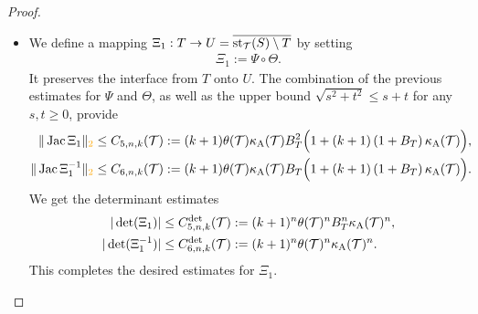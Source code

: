 \documentclass[10pt,letterpaper]{article}
\newcommand\cye[1]{%
  \protect\leavevmode
  \begingroup
    \color{red!35!yellow}%
    #1%
  \endgroup
}
\begin{document}
\begin{proof}
\begin{itemize}
        
        \item 
        We define a mapping $ \Xi_{1} : T \rightarrow U = \overline{\operatorname{st}_{{\mathcal T}}(S) \setminus T}$ by setting 
        \begin{align*}
            \Xi_{1} := \Psi \circ \Theta.
        \end{align*}
        It preserves the interface from $T$ onto $U$. 
        The combination of the previous estimates for $\Psi$ and $\Theta$,
        as well as the upper bound $\sqrt{s^2+t^2} \leq s + t$ for any $s,t \geq 0$,
        provide 
        \begin{align*}
            \| \Jacobian \Xi_{1} \|_{\cye{2}}
            &\leq 
            \Cfive{n}{k}(\calT)
            :=
            (k+1) 
            \theta(\calT)
            \kappa_{\maxcol}(\calT)
            B_{T}^{2}
            \Big( 
                1 
                + 
                (k+1) 
                \left( 1 + B_{T} \right)
                \kappa_{\maxcol}(\calT)
            \Big)            
            ,
            \\
            \| \Jacobian \Xi_{1}^{-1} \|_{\cye{2}}
            &\leq  
            \Csechs{n}{k}(\calT)
            :=
            (k+1) 
            \theta(\calT)
            \kappa_{\maxcol}(\calT)
            B_{T}
            \Big( 
                1 
                + 
                (k+1) 
                \left( 1 + B_{T} \right)
                \kappa_{\maxcol}(\calT)
            \Big)            
            .
        \end{align*}
        We get the determinant estimates
        \begin{align*}
            |\det(\Xi_{1})|
            &\leq 
            C^{\det}_{5,n,k}({\mathcal T})
            :=
            (k+1)^{n}
            \theta({\mathcal T})^{n}
            B_{T}^{n}
            \kappa_{{\rm A}}({\mathcal T})^{n}
            ,
            \\
            |\det(\Xi_{1}^{-1})|
            &\leq 
            C^{\det}_{6,n,k}({\mathcal T})
            :=
            (k+1)^{n}
            \theta({\mathcal T})^{n}
            \kappa_{{\rm A}}({\mathcal T})^{n}
            .
        \end{align*}
        This completes the desired estimates for $\Xi_{1}$. 
        

\end{itemize}
\end{proof}
\end{document}
